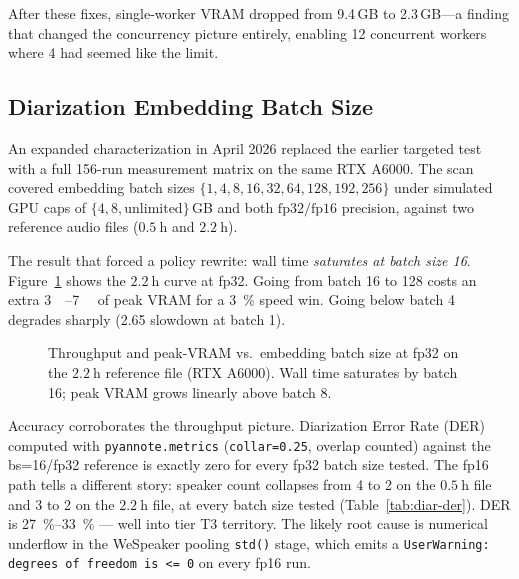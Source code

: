 \documentclass[conference,10pt]{IEEEtran}
\begin{document}
After these fixes, single-worker VRAM dropped from 9.4\,GB to 2.3\,GB---a
finding that changed the concurrency picture entirely, enabling 12 concurrent
workers where 4 had seemed like the limit.

\subsection{Diarization Embedding Batch Size}

An expanded characterization in April 2026 replaced the earlier targeted
test with a full 156-run measurement matrix on the same RTX A6000. The
scan covered embedding batch sizes
$\{1, 4, 8, 16, 32, 64, 128, 192, 256\}$ under simulated GPU caps of
$\{4, 8, \text{unlimited}\}$\,GB and both $\text{fp32}/\text{fp16}$
precision, against two reference audio files
($\SI{0.5}{\hour}$ and $\SI{2.2}{\hour}$).

The result that forced a policy rewrite: wall time
\emph{saturates at batch size 16}.
Figure~\ref{fig:diar-throughput} shows the $\SI{2.2}{\hour}$ curve at
fp32. Going from batch 16 to 128 costs an extra
\SIrange{3}{7}{\giga\byte} of peak VRAM for a \SI{3}{\percent} speed
win. Going below batch 4 degrades sharply (\SI{2.65}{\times} slowdown
at batch 1).

\begin{figure}[!t]
\centering
{}
\caption{Throughput and peak-VRAM vs.~embedding batch size at fp32
  on the $\SI{2.2}{\hour}$ reference file (RTX A6000). Wall time
  saturates by batch 16; peak VRAM grows linearly above batch 8.}
\label{fig:diar-throughput}
\end{figure}

Accuracy corroborates the throughput picture. Diarization Error Rate
(DER) computed with \texttt{pyannote.metrics}
(\texttt{collar=0.25}, overlap counted) against the bs=16/fp32
reference is exactly zero for every fp32 batch size tested. The fp16
path tells a different story: speaker count collapses from 4 to 2
on the $\SI{0.5}{\hour}$ file and 3 to 2 on the $\SI{2.2}{\hour}$ file,
at every batch size tested (Table~\ref{tab:diar-der}). DER is
\SIrange{27}{33}{\percent} --- well into tier T3 territory. The
likely root cause is numerical underflow in the WeSpeaker pooling
\texttt{std()} stage, which emits a
\texttt{UserWarning: degrees of freedom is <= 0} on every fp16 run.
\end{document}

